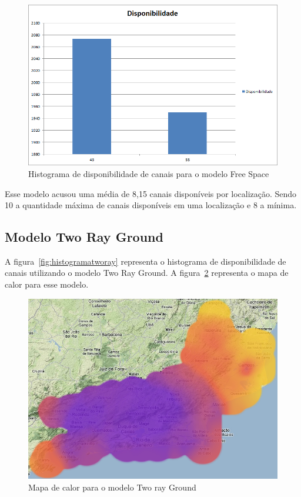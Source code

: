 \begin{figure}[htb]
\centering
\includegraphics[width=1.0\textwidth]{figs/histogramafreespaces}
\caption[Histograma de disponibilidade de canais para o modelo Free Space]
{Histograma de disponibilidade de canais para o modelo Free Space}
\label{fig:histogramafreespaces}
\end{figure} 


\FloatBarrier

Esse modelo acusou uma média de 8,15 canais disponíveis por localização. Sendo 10 a quantidade máxima de canais disponíveis em uma localização e 8 a mínima.


\subsection{Modelo Two Ray Ground}

A figura~\ref{fig:histogramatworay} representa o histograma de disponibilidade de canais utilizando o modelo Two Ray Ground. A figura~\ref{fig:tworayheatmap} representa o mapa de calor para esse modelo.

\begin{figure}[htb]
\centering
\includegraphics[width=1.0\textwidth]{figs/tworayheatmap}
\caption[Mapa de calor para o modelo Two Ray Ground]
{Mapa de calor para o modelo Two ray Ground}
\label{fig:tworayheatmap}
\end{figure} 

